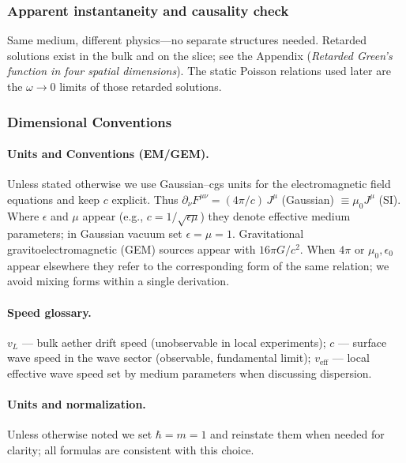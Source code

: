 \subsubsection{Apparent instantaneity and causality check}\label{sec:tsunami-causality}

Same medium, different physics---no separate structures needed. Retarded solutions exist in the bulk and on the slice; see the Appendix (\emph{Retarded Green's function in four spatial dimensions}). The static Poisson relations used later are the $\omega\to0$ limits of those retarded solutions.

\medskip
{}

\subsubsection{Dimensional Conventions}
\paragraph{Units and Conventions (EM/GEM).} Unless stated otherwise we use Gaussian--cgs units for the electromagnetic field equations and keep $c$ explicit. Thus $\partial_\nu F^{\mu\nu} = (4\pi/c)\, J^\mu$ (Gaussian) $\equiv \mu_0 J^\mu$ (SI). Where $\epsilon$ and $\mu$ appear (e.g., $c = 1/\sqrt{\epsilon\mu}$) they denote effective medium parameters; in Gaussian vacuum set $\epsilon=\mu=1$. Gravitational gravitoelectromagnetic (GEM) sources appear with $16\pi G/c^2$. When $4\pi$ or $\mu_0,\epsilon_0$ appear elsewhere they refer to the corresponding form of the same relation; we avoid mixing forms within a single derivation.

\paragraph{Speed glossary.} $v_L$ --- bulk aether drift speed (unobservable in local experiments); $c$ --- surface wave speed in the wave sector (observable, fundamental limit); $v_{\text{eff}}$ --- local effective wave speed set by medium parameters when discussing dispersion.

\paragraph{Units and normalization.} Unless otherwise noted we set $\hbar=m=1$ and reinstate them when needed for clarity; all formulas are consistent with this choice.

